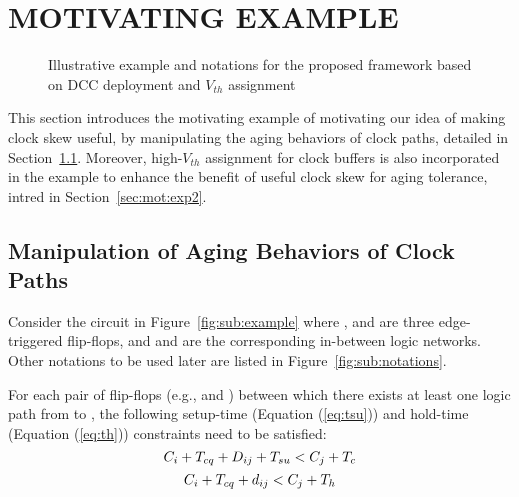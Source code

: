 \section{MOTIVATING EXAMPLE}
\label{sec:motivate}
\begin{figure*}[!ht]
    \centering
    \hspace{0.0cm}
    \caption{Illustrative example and notations for the proposed framework based on DCC deployment and $V_{th}$ assignment}
    \label{fig:en}
\end{figure*}


This section introduces the motivating example of motivating our idea of making clock skew useful, by manipulating the aging behaviors of clock paths, detailed in Section~\ref{sec:mot:exp1}. Moreover, high-$V_{th}$ assignment for clock buffers is also incorporated in the example to enhance the benefit of useful clock skew for aging tolerance, intred in Section~\ref{sec:mot:exp2}. 

\subsection{Manipulation of Aging Behaviors of Clock Paths}
\label{sec:mot:exp1}
Consider the circuit in Figure~\ref{fig:sub:example} where ,  and  are three edge-triggered flip-flops, and  and  are the corresponding in-between logic networks. Other notations to be used later are listed in Figure~\ref{fig:sub:notations}.

For each pair of flip-flops (e.g.,  and ) between which there exists at least one logic path from  to , the following setup-time (Equation (\ref{eq:tsu})) and hold-time (Equation (\ref{eq:th})) constraints need to be satisfied:
\begin{equation}
	\fontsize{9}{9.6} C_i+T_{cq}+D_{ij}+T_{su}<C_j+T_c
	\label{eq:tsu}
\end{equation}
\begin{equation}
	\fontsize{9}{9.6} C_i+T_{cq}+d_{ij}<C_j+T_h
	\label{eq:th}
\end{equation}

